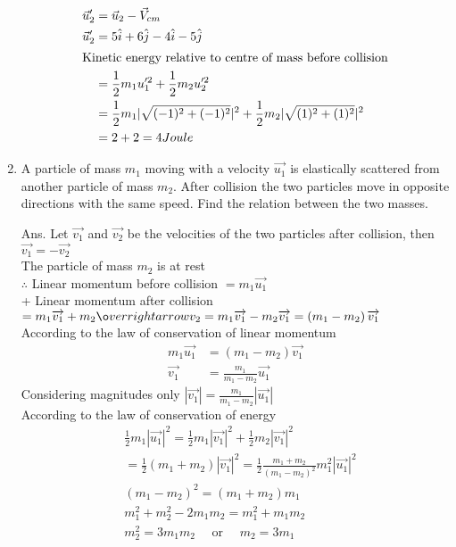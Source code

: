 \begin{enumerate}
\begin{answer}
\begin{align*}
	\vec{u}_2^{\prime}&=\vec{u}_2-\vec{V}_{cm}\\
	\vec{u}_2^{\prime}&=5\hat{i}+6\hat{j}-4\hat{i}-5\hat{j}\\
	\intertext{Kinetic energy relative to centre of mass before collision}
	&=\frac{1}{2}m_1u_1^{\prime 2}+\frac{1}{2}m_2u_2^{\prime 2}\\
	&=\frac{1}{2}m_1|\sqrt{(-1)^2+(-1)^2}|^2+\frac{1}{2}m_2|\sqrt{(1)^2+(1)^2}|^2\\
	&=2+2=4 Joule
	\end{align*}
\end{answer}
\item A particle of mass $m_{1}$ moving with a velocity $\overrightarrow{u_{1}}$ is elastically scattered from another particle of mass $m_{2}$. After collision the two particles move in opposite directions with the same speed. Find the relation between the two masses.
\begin{answer}
	Ans. Let $\overrightarrow{v_{1}}$ and $\overrightarrow{v_{2}}$ be the velocities of the two particles after collision, then\\ $\overrightarrow{v_{1}}=-\overrightarrow{v_{2}}$ \\
	The particle of mass $m_{2}$ is at rest\\
	$\therefore$ Linear momentum before collision $=m_{1} \overrightarrow{u_{1}}$\\
+	Linear momentum after collision $=m_{1} \overrightarrow{v_{1}}+m_{2} \o
verrightarrow{v_{2}}=m_{1} \overrightarrow{v_{1}}-m_{2} \overrightarrow{v_{1}}=\left(m_{1}-m_{2}\right) \overrightarrow{v_{1}}$\\
	According to the law of conservation of linear momentum
	\begin{align*}
	m_{1} \overrightarrow{u_{1}} &=\left(m_{1}-m_{2}\right) \overrightarrow{v_{1}} \\
	\overrightarrow{v_{1}} &=\frac{m_{1}}{m_{1}-m_{2}} \overrightarrow{u_{1}}
	\end{align*}
	Considering magnitudes only $\left|\overrightarrow{v_{1}}\right|=\frac{m_{1}}{m_{1}-m_{2}}\left|\overrightarrow{u_{1}}\right|$\\
	 According to the law of conservation of energy
	\begin{align*}
		&\frac{1}{2} m_{1}\left|\overrightarrow{u_{1}}\right|^{2}=\frac{1}{2} m_{1}\left|\overrightarrow{v_{1}}\right|^{2}+\frac{1}{2} m_{2}\left|\overrightarrow{v_{1}}\right|^{2} \\
		&=\frac{1}{2}\left(m_{1}+m_{2}\right)\left|\overrightarrow{v_{1}}\right|^{2}=\frac{1}{2} \frac{m_{1}+m_{2}}{\left(m_{1}-m_{2}\right)^{2}} m_{1}^{2}\left|\overrightarrow{u_{1}}\right|^{2} \\
		&\left(m_{1}-m_{2}\right)^{2}=\left(m_{1}+m_{2}\right) m_{1} \\
		&m_{1}^{2}+m_{2}^{2}-2 m_{1} m_{2}=m_{1}^{2}+m_{1} m_{2} \\
		&m_{2}^{2}=3 m_{1} m_{2} \quad \text { or } \quad m_{2}=3 m_{1}
	\end{align*}
\end{answer}
\end{enumerate}